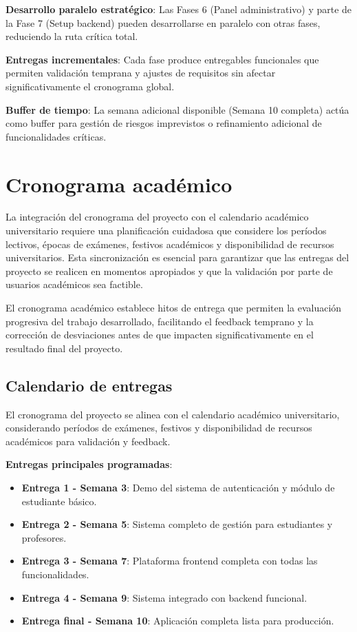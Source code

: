 \documentclass[12pt,a4paper,oneside]{report}
\providecommand{\tightlist}{%
  \setlength{\itemsep}{0pt}\setlength{\parskip}{0pt}}
\begin{document}
\textbf{Desarrollo paralelo estratégico}: Las Fases 6 (Panel
administrativo) y parte de la Fase 7 (Setup backend) pueden
desarrollarse en paralelo con otras fases, reduciendo la ruta crítica
total.

\textbf{Entregas incrementales}: Cada fase produce entregables
funcionales que permiten validación temprana y ajustes de requisitos sin
afectar significativamente el cronograma global.

\textbf{Buffer de tiempo}: La semana adicional disponible (Semana 10
completa) actúa como buffer para gestión de riesgos imprevistos o
refinamiento adicional de funcionalidades críticas.

\section{Cronograma académico}\label{cronograma-acaduxe9mico}

La integración del cronograma del proyecto con el calendario académico
universitario requiere una planificación cuidadosa que considere los
períodos lectivos, épocas de exámenes, festivos académicos y
disponibilidad de recursos universitarios. Esta sincronización es
esencial para garantizar que las entregas del proyecto se realicen en
momentos apropiados y que la validación por parte de usuarios académicos
sea factible.

El cronograma académico establece hitos de entrega que permiten la
evaluación progresiva del trabajo desarrollado, facilitando el feedback
temprano y la corrección de desviaciones antes de que impacten
significativamente en el resultado final del proyecto.

\subsection{Calendario de entregas}\label{calendario-de-entregas}

El cronograma del proyecto se alinea con el calendario académico
universitario, considerando períodos de exámenes, festivos y
disponibilidad de recursos académicos para validación y feedback.

\textbf{Entregas principales programadas}:

\begin{itemize}
\tightlist
\item
  \textbf{Entrega 1 - Semana 3}: Demo del sistema de autenticación y
  módulo de estudiante básico.
\item
  \textbf{Entrega 2 - Semana 5}: Sistema completo de gestión para
  estudiantes y profesores.
\item
  \textbf{Entrega 3 - Semana 7}: Plataforma frontend completa con todas
  las funcionalidades.
\item
  \textbf{Entrega 4 - Semana 9}: Sistema integrado con backend
  funcional.
\item
  \textbf{Entrega final - Semana 10}: Aplicación completa lista para
  producción.
\end{itemize}
\end{document}
